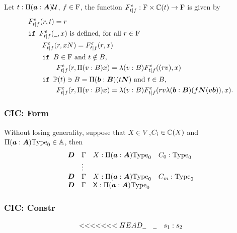 \begin{definition}
\begin{definition}
  Let $t : \Pi(\boldsymbol{a} : \boldsymbol{A}) \mathcal{U}$, $f \in \mathrm{F}$, the function $F^e_{t|f}: \mathrm{F} \times \mathbb{C} (t) \to \mathrm{F}$ is given by
   \begin{align*}
    & F^e_{t|f} (r, t) = r \\
    & \texttt{if } F^e_{t|f} (\mathord{\underline{\hspace{0.5em}}}, x) \text{ is defined, for all } r \in \mathrm{F} \\
    & \qquad F^{e}_{t|f} (r, xN ) = F^{e}_{t|f} (r, x) \\
    & \qquad \texttt{if } B \in \mathrm{F}\text{ and } t \notin B, \\
    & \qquad \qquad F^e_{t|f} (r, \Pi(v : B) x) = \lambda(v : B) F^e_{t|f}((rv), x) \\
    & \qquad  \texttt{if } \mathbb{P}(t) \ni B = \Pi(\boldsymbol{b}: \boldsymbol{B})(t \boldsymbol{N}) \text{ and } t \in B,\\ 
    & \qquad \qquad F^e_{t|f}(r, \Pi(v : B) x) = \lambda(v : B)F^e_{t|f}(r v \lambda(\boldsymbol{b} : \boldsymbol{B})(f \boldsymbol{N} (v \boldsymbol{b})) , x).
  \end{align*}

\end{definition}





\subsubsection*{CIC: Form}

Without losing generality, suppose that $X \in V$ ,$C_i \in \mathbb{C}(X)$ and $\Pi(\boldsymbol{a} : \boldsymbol{A}) \mathrm{Type}_0 \in \mathbb{A}$, then
\[
  \begin{array}{llll}
    \boldsymbol{D} & \Gamma & X : \Pi(\boldsymbol{a} : \boldsymbol{A}) \mathrm{Type}_0  & C_0 : \mathrm{Type}_0 \\
      & \vdots & & \\
    \boldsymbol{D} & \Gamma & X : \Pi(\boldsymbol{a} : \boldsymbol{A}) \mathrm{Type}_0  & C_m : \mathrm{Type}_0 \\
    \boldsymbol{D} & \Gamma & \text{{\sffamily X}} : \Pi(\boldsymbol{a} : \boldsymbol{A}) \mathrm{Type}_0 & \\
  \end{array}
\]


\subsubsection*{CIC: Constr}

\[
  \begin{array}{lll}
<<<<<<< HEAD
    \mathord{\underline{\hspace{0.5em}}} & \mathord{\underline{\hspace{0.5em}}} & s_1 : s_2
  \end{array}
\]



\end{definition}
